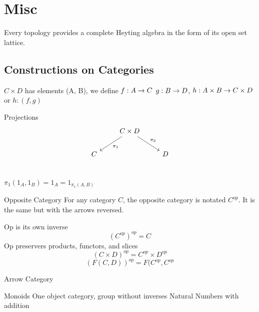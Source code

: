 \documentclass[../notes.tex]{subfiles}
\begin{document}
\section{Misc}

Every topology provides a complete Heyting algebra in the form of its open set lattice.

\subsection{Constructions on Categories}

$C \times D$  has elements (A, B), we define
$ f : A \rightarrow C $
$ g : B \rightarrow D $,
$ h : A \times B \rightarrow C \times D $ or $ h : (f, g) $




Projections
\[
  \begin{tikzcd}
    & C \times D \arrow[dl, "\pi_1"] \arrow[dr, "\pi_2"] &   \\
    C  &  & D \\
  \end{tikzcd}
\]

$\pi_1( 1_A, 1_B )= 1_A = 1_{\pi_1(A, B)} $

Opposite Category
For any category $C$, the opposite category is notated $C^{op}$.
It is the same but with the arrows reversed.

Op is its own inverse
$$ (C^{op})^{op} = C $$
Op preservers products, functors, and slices %
$$ (C \times D)^{op} = C^{op} \times D^{op} $$
$$ (F(C,D))^{op} = F(C^{op}, C^{op} $$

Arrow Category

\begin{definition}
  Monoids
  One object category, group without inverses
  Natural Numbers with addition
\end{definition}
\end{document}
